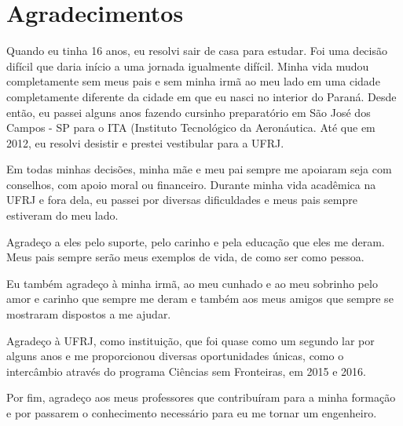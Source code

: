\dedication{Este trabalho é dedicado aos meus pais}

\chapter*{Agradecimentos}

Quando eu tinha 16 anos, eu resolvi sair de casa para estudar. 
Foi uma decisão difícil que daria início a uma jornada igualmente difícil. Minha vida mudou 
completamente sem meus pais e sem minha irmã ao meu lado em uma cidade completamente diferente
da cidade em que eu nasci no interior do Paraná. Desde então, eu passei alguns anos fazendo 
cursinho preparatório em São José dos Campos - SP para o ITA (Instituto Tecnológico da Aeronáutica.
Até que em 2012, eu resolvi desistir e prestei vestibular para a UFRJ.

Em todas minhas decisões, minha mãe e meu pai sempre me apoiaram seja com conselhos, 
com apoio moral ou financeiro. Durante minha vida acadêmica na UFRJ e fora dela, eu passei
por diversas dificuldades e meus pais sempre estiveram do meu lado.

Agradeço a eles pelo suporte, pelo carinho e pela educação que eles me deram. 
Meus pais sempre serão meus exemplos de vida, de como ser como pessoa.

Eu também agradeço à minha irmã, ao meu cunhado e ao meu sobrinho pelo amor e carinho 
que sempre me deram e também aos meus amigos que sempre se mostraram dispostos a me ajudar.

Agradeço à UFRJ, como instituição, que foi quase como um segundo lar por alguns 
anos e me proporcionou diversas oportunidades únicas, como o intercâmbio através 
do programa Ciências sem Fronteiras, em 2015 e 2016.

Por fim, agradeço aos meus professores que contribuíram para a minha formação e por passarem
o conhecimento necessário para eu me tornar um engenheiro.